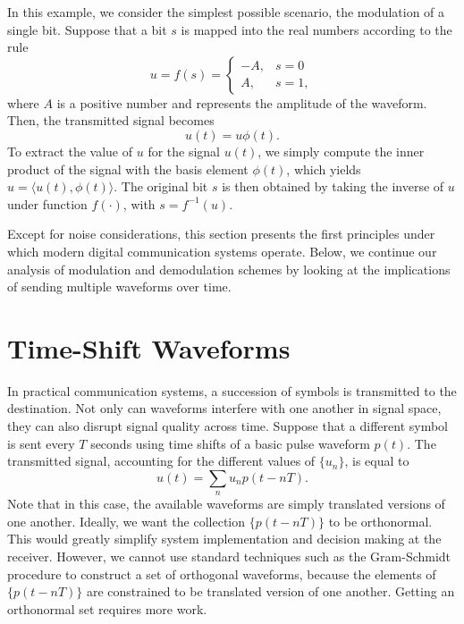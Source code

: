 \begin{example}
In this example, we consider the simplest possible scenario, the modulation of a single bit.
Suppose that a bit $s$ is mapped into the real numbers according to the rule
\begin{equation*}
u = f(s) = \begin{cases} -A, & s = 0 \\
A, & s = 1 , \end{cases}
\end{equation*}
where $A$ is a positive number and represents the amplitude of the waveform.
Then, the transmitted signal becomes
\begin{equation*}
u(t) = u \phi (t) .
\end{equation*}
To extract the value of $u$ for the signal $u(t)$, we simply compute the inner product of the signal with the basis element $\phi(t)$, which yields $u = \langle u(t), \phi(t) \rangle$.
The original bit $s$ is then obtained by taking the inverse of $u$ under function $f(\cdot)$, with $s = f^{-1} (u)$.
\end{example}

Except for noise considerations, this section presents the first principles under which modern digital communication systems operate.
Below, we continue our analysis of modulation and demodulation schemes by looking at the implications of sending multiple waveforms over time.


\section{Time-Shift Waveforms}

In practical communication systems, a succession of symbols is transmitted to the destination.
Not only can waveforms interfere with one another in signal space, they can also disrupt signal quality across time.
Suppose that a different symbol is sent every $T$ seconds using time shifts of a basic pulse waveform $p(t)$.
The transmitted signal, accounting for the different values of $\{ u_n \}$, is equal to
\begin{equation*}
u(t) = \sum_{n} u_n p (t - nT) .
\end{equation*}
Note that in this case, the available waveforms are simply translated versions of one another.
Ideally, we want the collection $\{ p(t - nT) \}$ to be orthonormal.
This would greatly simplify system implementation and decision making at the receiver.
However, we cannot use standard techniques such as the Gram-Schmidt procedure to construct a set of orthogonal waveforms, because the elements of $\{ p(t - nT) \}$ are constrained to be translated version of one another.
Getting an orthonormal set requires more work.


